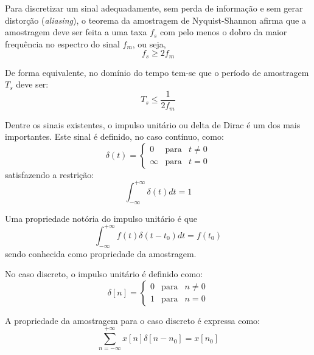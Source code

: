 \documentclass[12pt,a4paper]{report}
\begin{document}
  Para discretizar um sinal adequadamente, sem perda de informação e sem gerar distorção (\textit{aliasing}), o
  teorema da amostragem de Nyquist-Shannon \cite{lathi} afirma que a amostragem deve ser feita a uma taxa $f_s$
  com pelo menos o dobro da maior frequência no espectro do sinal $f_m$, ou seja,
  \begin{equation}
    f_s \geq 2 f_m
  \end{equation}

  De forma equivalente, no domínio do tempo tem-se que o período de amostragem $T_s$ deve ser:
  \begin{equation}
    T_s  \leq \frac{1}{2 f_m}
  \end{equation}

  Dentre os sinais existentes, o impulso unitário ou delta de Dirac é um dos mais importantes. Este sinal é
  definido, no caso contínuo, como:
  \begin{equation}
    \delta(t) =
      \left
      \{
      \begin{array}{rcl}
        0 & \mbox{para} & t \neq 0 \\
        \infty & \mbox{para} & t = 0
      \end{array}
      \right.
  \end{equation}
  satisfazendo a restrição:
  \begin{equation}
    \int_{-\infty}^{+\infty} \delta(t) dt = 1
  \end{equation}

  Uma propriedade notória do impulso unitário é que
  \begin{equation}
    \int_{-\infty}^{+\infty} f(t) \delta(t-t_0) dt = f(t_0)
  \end{equation}
  sendo conhecida como propriedade da amostragem.

  No caso discreto, o impulso unitário é definido como:
  \begin{equation}
    \delta[n] =
      \left
      \{
      \begin{array}{rcl}
        0 & \mbox{para} & n \neq 0 \\
        1 & \mbox{para} & n = 0
      \end{array}
      \right.
  \end{equation}

  A propriedade da amostragem para o caso discreto é expressa como:
  \begin{equation}
    \sum_{n = -\infty}^{+\infty} x[n] \delta[n-n_0] = x[n_0]
  \end{equation}
\end{document}

